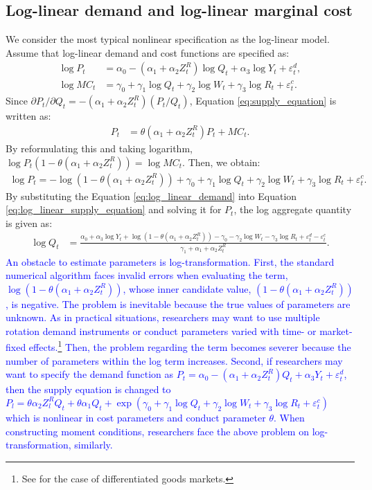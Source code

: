 \documentclass[11pt, a4paper]{article}
\begin{document}
\subsection{Log-linear demand and log-linear marginal cost}
We consider the most typical nonlinear specification as the log-linear model.
Assume that log-linear demand and cost functions are specified as:
\begin{align}
    \log P_{t} &= \alpha_0 - (\alpha_1 + \alpha_2 Z^{R}_{t}) \log Q_t + \alpha_3 \log Y_t + \varepsilon^{d}_{t},\label{eq:log_linear_demand}\\
    \log MC_t &= \gamma_0 + \gamma_1 \log Q_t +  \gamma_2 \log W_{t} + \gamma_3 \log R_t + \varepsilon^{c}_{t}.\label{eq:log_linear_marginal_cost}
\end{align}
Since $\partial P_t/\partial Q_t = - (\alpha_1 + \alpha_2 Z_{t}^R) (P_t/Q_t) $, Equation \eqref{eq:supply_equation} is written as:
\begin{align}
    P_t &= \theta (\alpha_1 + \alpha_2 Z^{R}_{t}) P_t + MC_t.
\end{align}
By reformulating this and taking logarithm, $\log P_t(1 -\theta (\alpha_1 + \alpha_2 Z^{R}_{t})) = \log MC_t.$
Then, we obtain:
\begin{align}
    \log P_t = - \log(1 - \theta(\alpha_1 + \alpha_2 Z^{R}_{t})) + \gamma_0 + \gamma_1 \log Q_t +  \gamma_2 \log W_{t} + \gamma_3 \log R_t + \varepsilon^{c}_{t}. \label{eq:log_linear_supply_equation}
\end{align}
By substituting the Equation \eqref{eq:log_linear_demand} into Equation \eqref{eq:log_linear_supply_equation} and solving it for $P_{t}$, the log aggregate quantity is given as: 
\begin{align}
    \log Q_t &= \frac{ \alpha_0 + \alpha_3 \log Y_t + \log (1 - \theta (\alpha_1 + \alpha_2 Z^{R}_{t})) - \gamma_0  -  \gamma_2 \log W_{t} - \gamma_3 \log R_t + \varepsilon^{d}_{t} - \varepsilon^{c}_{t}}{\gamma_1+ \alpha_1 + \alpha_2 Z^{R}_{t} }.\label{eq:quantity_loglinear}
\end{align}
\textcolor{blue}{An obstacle to estimate parameters is log-transformation. First, the standard numerical algorithm faces invalid errors when evaluating the term, $\log (1 - \theta (\alpha_1 + \alpha_2 Z^{R}_{t}))$, whose inner candidate value, $(1 - \theta (\alpha_1 + \alpha_2 Z^{R}_{t}))$, is negative. The problem is inevitable because the true values of parameters are unknown. As in practical situations, researchers may want to use multiple rotation demand instruments or conduct parameters varied with time- or market- fixed effects.\footnote{See \cite{michel2018estimating} for the case of differentiated goods markets.} Then, the problem regarding the term becomes severer because the number of parameters within the log term increases. Second, if researchers may want to specify the demand function as $P_t=\alpha_0-\left(\alpha_1+\alpha_2 Z_t^R\right) Q_t+\alpha_3 Y_t+\varepsilon_t^d$, then the supply equation is changed to $P_l=\theta \alpha_2 Z_l^R Q_t+\theta \alpha_1Q_t+\exp(\gamma_0+\gamma_1 \log Q_t+\gamma_2 \log W_t+\gamma_3 \log R_t+\varepsilon_t^c)$ which is nonlinear in cost parameters and conduct parameter $\theta$. When constructing moment conditions, researchers face the above problem on log-transformation, similarly.}
\end{document}
